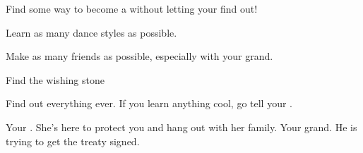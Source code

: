 \documentclass[char]{NeptuneBall}
\begin{document}
\begin{itemz}[Goals]
  \item Find some way to become a \cWillow{\mer} without letting your \cAriel{\parent} find out!
  \item Learn as many dance styles as possible.
  \item Make as many friends as possible, especially with your grand\cKing{\pa}.
	\item Find the wishing stone
  \item Find out everything ever. If you learn anything cool, go tell your \cAriel{\parent}.
\end{itemz}

\begin{contacts}
  \contact{\cAriel{}} Your \cAriel{\parent}. She's here to protect you and hang out with her family.
	\contact{\cKing{}} Your grand\cKing{\parent}. He is trying to get the treaty signed.
\end{contacts}
\end{document}
